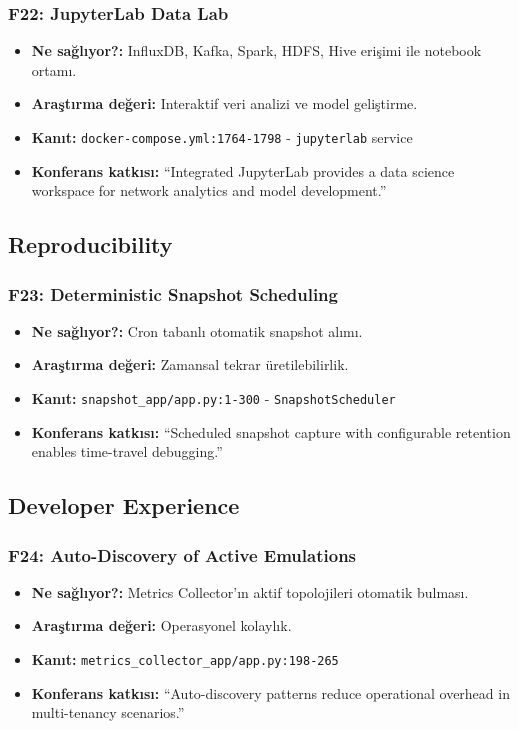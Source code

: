 \documentclass[10pt,a4paper]{article}
\begin{document}
\subsubsection{F22: JupyterLab Data Lab}

\begin{itemize}
\item \textbf{Ne sağlıyor?:} InfluxDB, Kafka, Spark, HDFS, Hive erişimi ile notebook ortamı.
\item \textbf{Araştırma değeri:} Interaktif veri analizi ve model geliştirme.
\item \textbf{Kanıt:} \texttt{docker-compose.yml:1764-1798} - \texttt{jupyterlab} service
\item \textbf{Konferans katkısı:} ``Integrated JupyterLab provides a data science workspace for network analytics and model development.''
\end{itemize}

\subsection{Reproducibility}

\subsubsection{F23: Deterministic Snapshot Scheduling}

\begin{itemize}
\item \textbf{Ne sağlıyor?:} Cron tabanlı otomatik snapshot alımı.
\item \textbf{Araştırma değeri:} Zamansal tekrar üretilebilirlik.
\item \textbf{Kanıt:} \texttt{snapshot\_app/app.py:1-300} - \texttt{SnapshotScheduler}
\item \textbf{Konferans katkısı:} ``Scheduled snapshot capture with configurable retention enables time-travel debugging.''
\end{itemize}

\subsection{Developer Experience}

\subsubsection{F24: Auto-Discovery of Active Emulations}

\begin{itemize}
\item \textbf{Ne sağlıyor?:} Metrics Collector'ın aktif topolojileri otomatik bulması.
\item \textbf{Araştırma değeri:} Operasyonel kolaylık.
\item \textbf{Kanıt:} \texttt{metrics\_collector\_app/app.py:198-265}
\item \textbf{Konferans katkısı:} ``Auto-discovery patterns reduce operational overhead in multi-tenancy scenarios.''
\end{itemize}
\end{document}
